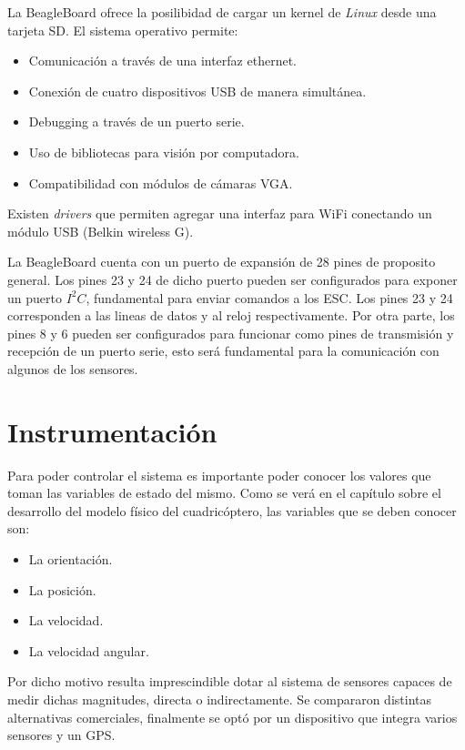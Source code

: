 \documentclass[main]{subfiles}
\begin{document}
La BeagleBoard ofrece la posilibidad de cargar un kernel de \emph{Linux} desde una tarjeta SD. El sistema operativo permite:
\begin{itemize}
\item Comunicaci\'on a trav\'es de una interfaz ethernet.
\item Conexi\'on de cuatro dispositivos USB de manera simult\'anea.
\item Debugging a trav\'es de un puerto serie.
\item Uso de bibliotecas para visi\'on por computadora. 
\item Compatibilidad con m\'odulos de c\'amaras VGA.
\end{itemize}

Existen \textit{drivers} que permiten agregar una interfaz para WiFi conectando un m\'odulo USB (Belkin wireless G).

La BeagleBoard cuenta con un puerto de expansi\'on de 28 pines de proposito general. Los pines 23 y 24 de dicho puerto pueden ser configurados para exponer un puerto $I^2C$, fundamental para enviar comandos a los ESC. Los pines 23 y 24 corresponden a las lineas de datos y al reloj respectivamente. Por otra parte, los pines 8 y 6 pueden ser configurados para funcionar como pines de transmisi\'on y recepci\'on de un puerto serie, esto ser\'a fundamental para la comunicaci\'on con algunos de los sensores.

\section{Instrumentaci\'on}

Para poder controlar el sistema es importante poder conocer los valores que toman las variables de estado del mismo. Como se ver\'a en el cap\'itulo sobre el desarrollo del modelo f\'isico del cuadric\'optero, las variables que se deben conocer son:

\begin{itemize}
\item La orientaci\'on.
\item La posici\'on.
\item La velocidad.
\item La velocidad angular.
\end{itemize}

Por dicho motivo resulta imprescindible dotar al sistema de sensores capaces de medir dichas magnitudes, directa o indirectamente. Se compararon distintas alternativas comerciales, finalmente se opt\'o por un dispositivo que integra varios sensores y un GPS.
\end{document}
